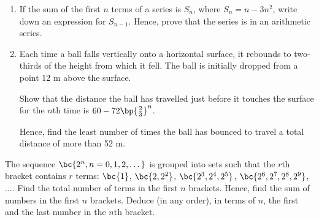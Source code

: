 \begin{problem}
    \begin{enumerate}
        \item If the sum of the first $n$ terms of a series is $S_n$, where $S_n = n - 3n^2$, write down an expression for $S_{n-1}$. Hence, prove that the series is in an arithmetic series.
        \item Each time a ball falls vertically onto a horizontal surface, it rebounds to two-thirds of the height from which it fell. The ball is initially dropped from a point 12 m above the surface.
        
        Show that the distance the ball has travelled just before it touches the surface for the $n$th time is $60 - 72 \bp{\frac23}^n$.

        Hence, find the least number of times the ball has bounced to travel a total distance of more than 52 m.
    \end{enumerate}
\end{problem}

\begin{problem}
    The sequence $\bc{2^n, n = 0, 1, 2, \dots}$ is grouped into sets such that the $r$th bracket contains $r$ terms: $\bc{1}$, $\bc{2, 2^2}$, $\bc{2^3, 2^4, 2^5}$, $\bc{2^6, 2^7, 2^8, 2^9}$, $\dots$. Find the total number of terms in the first $n$ brackets. Hence, find the sum of numbers in the first $n$ brackets. Deduce (in any order), in terms of $n$, the first and the last number in the $n$th bracket.
\end{problem}
